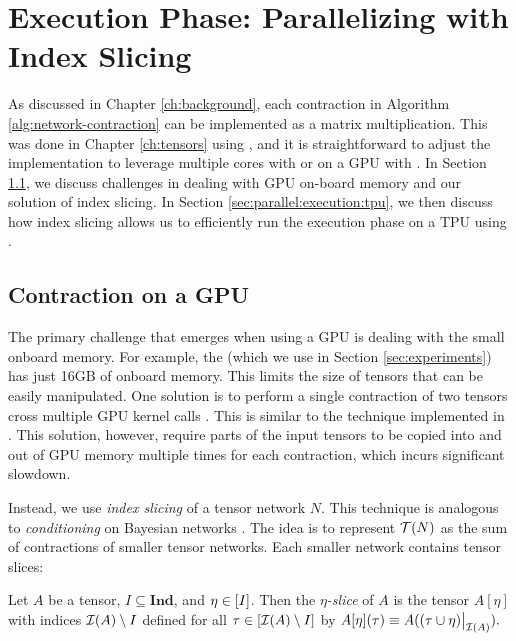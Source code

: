 \section{Execution Phase: Parallelizing with Index Slicing}
\label{sec:parallel:execution}
As discussed in Chapter \ref{ch:background}, each contraction in Algorithm \ref{alg:network-contraction} can be implemented as a matrix multiplication.
This was done in Chapter \ref{ch:tensors} using  \cite{numpy}, and it is straightforward to adjust the implementation to leverage multiple cores with  or on a GPU with  \cite{ABCCDDDGII16}. 
In Section \ref{sec:parallel:execution:gpu}, we discuss challenges in dealing with GPU on-board memory and our solution of index slicing. In Section \ref{sec:parallel:execution:tpu}, we then discuss how index slicing allows us to efficiently run the execution phase on a TPU using  \cite{jax2018github}.

\subsection{Contraction on a GPU}
\label{sec:parallel:execution:gpu}
The primary challenge that emerges when using a GPU is dealing with the small onboard memory. For example, the  (which we use in Section \ref{sec:experiments}) has just 16GB of onboard memory. This limits the size of tensors that can be easily manipulated. One solution is to perform a single contraction of two tensors cross multiple GPU kernel calls \cite{RRBSKH08}. This is similar to the technique implemented in  \cite{FHZ19}. This solution, however, require parts of the input tensors to be copied into and out of GPU memory multiple times for each contraction, which incurs significant slowdown.

Instead, we use \emph{index slicing} \cite{CZHNS18,GK20,VBNHRBM19} of a tensor network $N$. This technique is analogous to \emph{conditioning} on Bayesian networks \cite{darwiche01,dechter99,pearl86,SAS94}. The idea is to represent $\mathcal{T}(N)$ as the sum of contractions of smaller tensor networks. Each smaller network contains tensor slices:

\begin{definition}
Let $A$ be a tensor, $I \subseteq \textbf{Ind}$, and $\eta \in [I]$. Then the \emph{$\eta$-slice} of $A$ is the tensor $A[\eta]$ with indices $\mathcal{I}(A) \setminus I$ defined for all $\tau \in [\mathcal{I}(A) \setminus I]$ by $A[\eta](\tau) \equiv A((\tau \cup \eta)\big|_{\mathcal{I}(A)}).$
\end{definition}

